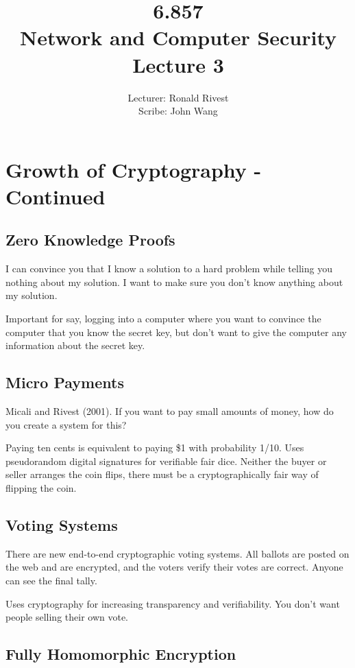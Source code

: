 \documentclass[psamsfonts]{amsart}
\title{6.857 \\
Network and Computer Security \\
Lecture 3}
\author{Lecturer: Ronald Rivest\\
Scribe: John Wang}
\begin{document}
\maketitle

\section{Growth of Cryptography - Continued}

\subsection{Zero Knowledge Proofs}

I can convince you that I know a solution to a hard problem while telling you nothing about my solution. I want to make sure you don't know anything about my solution.

Important for say, logging into a computer where you want to convince the computer that you know the secret key, but don't want to give the computer any information about the secret key.

\subsection{Micro Payments}

Micali and Rivest (2001). If you want to pay small amounts of money, how do you create a system for this?

Paying ten cents is equivalent to paying \$1 with probability 1/10. Uses pseudorandom digital signatures for verifiable fair dice. Neither the buyer or seller arranges the coin flips, there must be a cryptographically fair way of flipping the coin.

\subsection{Voting Systems}

There are new end-to-end cryptographic voting systems. All ballots are posted on the web and are encrypted, and the voters verify their votes are correct. Anyone can see the final tally. 

Uses cryptography for increasing transparency and verifiability. You don't want people selling their own vote. 

\subsection{Fully Homomorphic Encryption}
\end{document}
